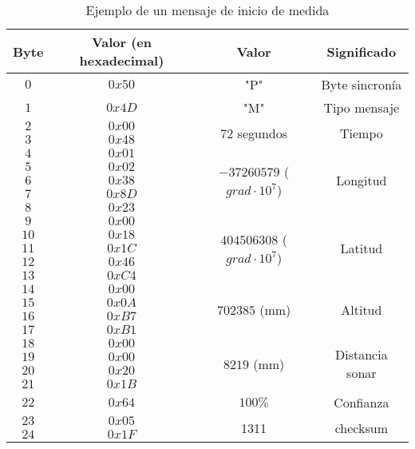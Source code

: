 \begin{table}
	\centering
	\caption{Ejemplo de un mensaje de inicio de medida}
	\begin{tabular}{|c|c|c|c|}\hline
		\textbf{Byte} 	&	\textbf{Valor (en hexadecimal)}	&\textbf{Valor}	&\textbf{Significado} \\ \hline \hline
		$0$ 			&  $0x50$			& "P"	& Byte sincronía	\\ \hline
		$1$				&  $0x4D$			& "M"	& Tipo mensaje		\\ \hline
		$2$				&  $0x00$			& \multirow{2}{*}{$72$ segundos} & \multirow{2}{*}{Tiempo} \\
		$3$				&  $0x48$			&  & \\ \hline	
		$4$				&  $0x01$			&  \multirow{5}{*}{$-37260579$ ($grad \cdot 10^{7}$) } &  \multirow{5}{*}{Longitud}  \\
		$5$				&  $0x02$			&  &   \\ 	
		$6$				&  $0x38$			&  &    \\ 	
		$7$				&  $0x8D$			&  &    \\ 	
		$8$				&  $0x23$			&   &   \\ \hline
		$9$				&  $0x00$			& \multirow{5}{*}{$404506308$ ($grad \cdot 10^{7}$) } &  \multirow{5}{*}{Latitud}   \\
		$10$				&  $0x18$			&  &     \\ 	
		$11$				&  $0x1C$			&  &      \\ 	
		$12$				&  $0x46$			&  &      \\ 	
		$13$				&  $0xC4$			&  &      \\ \hline
		$14$				&  $0x00$			& \multirow{4}{*}{$702385$ (mm) } & \multirow{4}{*}{Altitud}\\
		$15$				&  $0x0A$			&   &     \\ 	
		$16$				&  $0xB7$			&   &         \\ 	
		$17$				&  $0xB1$			&   &        \\ \hline
		$18$				&  $0x00$			& \multirow{4}{*}{$8219$ (mm) } & \multirow{4}{*}{Distancia sonar}\\
		$19$				&  $0x00$			&     &     \\ 	
		$20$				&  $0x20$			&     &     \\ 	
		$21$				&  $0x1B$			&     &     \\ 	\hline
		$22$				&  $0x64$			& $100 \%$ &     Confianza \\ \hline
		$23$				&  $0x05$			&  \multirow{2}{*}{1311}	& \multirow{2}{*}{checksum} \\
		$24$				&  $0x1F$			&     &     \\ \hline	
		
		
	\end{tabular}
	\label{tab:5}
\end{table}


